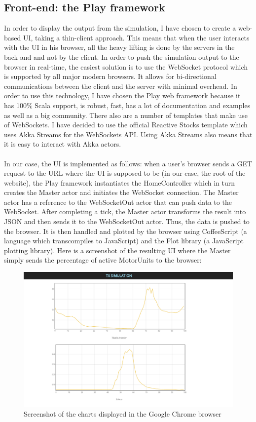 \documentclass[titlepage]{article}
\begin{document}
\subsection{Front-end: the Play framework}
\label{sec:front}
In order to display the output from the simulation, I have chosen to create a web-based UI, taking a thin-client approach. This means that when the user interacts with the UI in his browser, all the heavy lifting is done by the servers in the back-and and not by the client. In order to push the simulation output to the browser in real-time, the easiest solution is to use the WebSocket protocol which is supported by all major modern browsers. It allows for bi-directional communications between the client and the server with minimal overhead. In order to use this technology, I have chosen the Play web framework because it has 100\% Scala support, is robust, fast, has a lot of documentation and examples as well as a big community. There also are a number of templates that make use of WebSockets. I have decided to use the official Reactive Stocks template which uses Akka Streams for the WebSockets API. Using Akka Streams also means that it is easy to interact with Akka actors.
\\\\
In our case, the UI is implemented as follows: when a user's browser sends a GET request to the URL where the UI is supposed to be (in our case, the root of the website), the Play framework instantiates the HomeController which in turn creates the Master actor and initiates the WebSocket connection. The Master actor has a reference to the WebSocketOut actor that can push data to the WebSocket. After completing a tick, the Master actor transforms the result into JSON and then sends it to the WebSocketOut actor. Thus, the data is pushed to the browser. It is then handled and plotted by the browser using CoffeeScript (a language which transcompiles to JavaScript) and the Flot library (a JavaScript plotting library). Here is a screenshot of the resulting UI where the Master simply sends the percentage of active MotorUnits to the browser: 
\begin{figure}[H]
  \centering
	\includegraphics[scale=0.45]{webUI.PNG}
	\caption{Screenshot of the charts displayed in the Google Chrome browser}
  \label{fig:webUI}
\end{figure}
\end{document}
